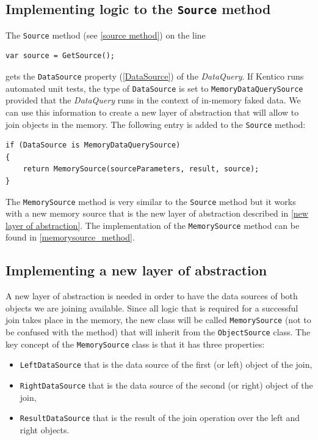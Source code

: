 \documentclass[
  print,
  table,
  nolof,
  nolot,
  nocover,
  oneside
]{fithesis3}
\begin{document}
\subsection{Implementing logic to the \texttt{Source} method}
\label{implementing logic to the Source method}

The \texttt{Source} method (see \autoref{source method}) on the line
\begin{lstlisting}
var source = GetSource();
\end{lstlisting}
gets the \texttt{DataSource} property (\autoref{DataSource}) of the \textit{DataQuery}. If Kentico runs automated unit tests, the type of \texttt{DataSource} is set to \texttt{MemoryDataQuerySource} provided that the \textit{DataQuery} runs in the context of in-memory faked data. We can use this information to create a new layer of abstraction that will allow to join objects in the memory. The following entry is added to the \texttt{Source} method:
\begin{lstlisting}
if (DataSource is MemoryDataQuerySource)
{
    return MemorySource(sourceParameters, result, source);
}
\end{lstlisting}

The \texttt{MemorySource} method is very similar to the \texttt{Source} method but it works with a new memory source that is the new layer of abstraction described in \autoref{new layer of abstraction}. The implementation of the \texttt{MemorySource} method can be found in \autoref{memorysource_method}.


\subsection{Implementing a new layer of abstraction}
\label{new layer of abstraction}

A new layer of abstraction is needed in order to have the data sources of both objects we are joining available. Since all logic that is required for a successful join takes place in the memory, the new class will be called \texttt{MemorySource} (not to be confused with the method) that will inherit from the \texttt{ObjectSource} class. The key concept of the \texttt{MemorySource} class is that it has three properties:
\begin{itemize}
    \item \texttt{LeftDataSource} that is the data source of the first (or left) object of the join,
    \item \texttt{RightDataSource} that is the data source of the second (or right) object of the join,
    \item \texttt{ResultDataSource} that is the result of the join operation over the left and right objects.
\end{itemize}
\end{document}
